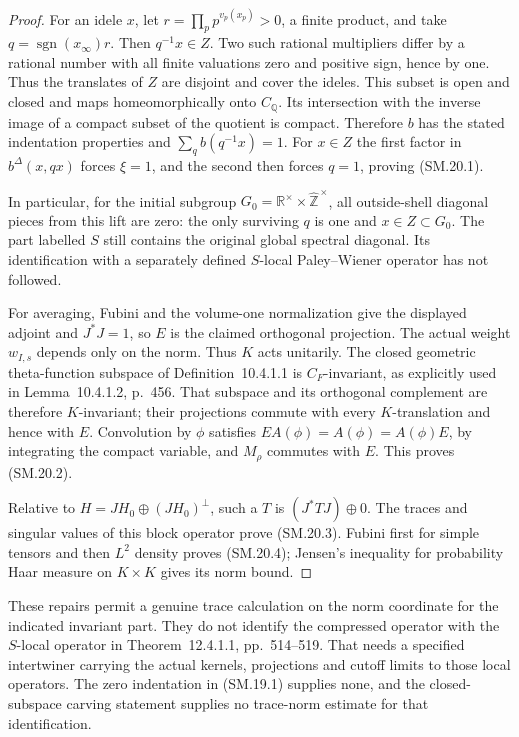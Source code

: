 \documentclass[11pt,a4paper]{article}
\theoremstyle{definition}\newtheorem{definition}[theorem]{Definition}
\theoremstyle{remark}\newtheorem{remark}[theorem]{Remark}
\begin{document}
\begin{proof}
For an idele $x$, let $r=\prod_p p^{v_p(x_p)}>0$, a finite
product, and take $q=\operatorname{sgn}(x_\infty)r$.
Then $q^{-1}x\in Z$.  Two such rational multipliers differ
by a rational number with all finite valuations zero and
positive sign, hence by one.  Thus the translates of $Z$
are disjoint and cover the ideles.  This subset is open
and closed and maps homeomorphically onto $C_{\mathbb Q}$.
Its intersection with the inverse image of a compact subset
of the quotient is compact.  Therefore $b$ has the stated
indentation properties and $\sum_qb(q^{-1}x)=1$.
For $x\in Z$ the first factor in $b^\Delta(x,qx)$ forces
$\xi=1$, and the second then forces $q=1$, proving (SM.20.1).

In particular, for the initial subgroup
$G_0=\mathbb R^\times\times\widehat{\mathbb Z}^{\,\times}$,
all outside-shell diagonal pieces from this lift are zero:
the only surviving $q$ is one and $x\in Z\subset G_0$.
The part labelled $S$ still contains the original global
spectral diagonal.  Its identification with a separately
defined $S$-local Paley--Wiener operator has not followed.

For averaging, Fubini and the volume-one normalization give
the displayed adjoint and $J^*J=1$, so $E$ is the claimed
orthogonal projection.  The actual weight $w_{I,s}$ depends
only on the norm.  Thus $K$ acts unitarily.
The closed geometric theta-function subspace of
Definition~10.4.1.1 is $C_F$-invariant, as explicitly used
in Lemma~10.4.1.2, p.~456.  That subspace and its orthogonal
complement are therefore $K$-invariant; their projections
commute with every $K$-translation and hence with $E$.
Convolution by $\phi$ satisfies
$EA(\phi)=A(\phi)=A(\phi)E$, by integrating the compact
variable, and $M_\rho$ commutes with $E$.  This proves
(SM.20.2).

Relative to $H=JH_0\oplus(JH_0)^\perp$, such a $T$ is
$(J^*TJ)\oplus0$.  The traces and singular values of this
block operator prove (SM.20.3).  Fubini first for simple
tensors and then $L^2$ density proves (SM.20.4); Jensen's
inequality for probability Haar measure on $K\times K$
gives its norm bound.
\end{proof}

These repairs permit a genuine trace calculation on the norm
coordinate for the indicated invariant part.  They do not
identify the compressed operator with the $S$-local operator
in Theorem~12.4.1.1, pp.~514--519.  That needs a specified
intertwiner carrying the actual kernels, projections and cutoff
limits to those local operators.  The zero indentation in
(SM.19.1) supplies none, and the closed-subspace carving
statement supplies no trace-norm estimate for that identification.
\end{document}
